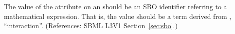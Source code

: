The value of the  attribute on an \Event should be
an SBO identifier referring to a mathematical expression.  That is, the
value should be a term derived from \sbointeractionID,
``interaction''.  (References: SBML L3V1 Section~\ref{sec:sbo}.)
